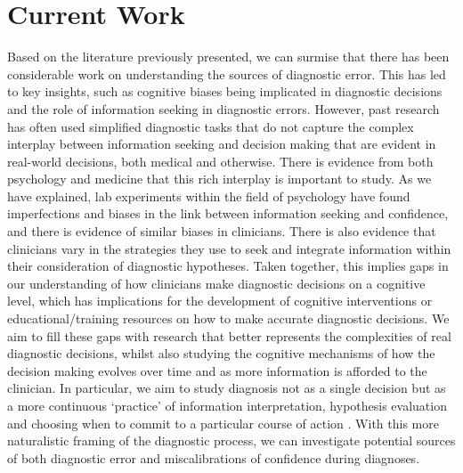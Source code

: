 \documentclass[a4paper, nobind]{templates/ociamthesis}
\begin{document}
\section{Current Work}\label{current-work}

Based on the literature previously presented, we can surmise that there has been considerable work on understanding the sources of diagnostic error. This has led to key insights, such as cognitive biases being implicated in diagnostic decisions and the role of information seeking in diagnostic errors. However, past research has often used simplified diagnostic tasks that do not capture the complex interplay between information seeking and decision making that are evident in real-world decisions, both medical and otherwise. There is evidence from both psychology and medicine that this rich interplay is important to study. As we have explained, lab experiments within the field of psychology have found imperfections and biases in the link between information seeking and confidence, and there is evidence of similar biases in clinicians. There is also evidence that clinicians vary in the strategies they use to seek and integrate information within their consideration of diagnostic hypotheses. Taken together, this implies gaps in our understanding of how clinicians make diagnostic decisions on a cognitive level, which has implications for the development of cognitive interventions or educational/training resources on how to make accurate diagnostic decisions. We aim to fill these gaps with research that better represents the complexities of real diagnostic decisions, whilst also studying the cognitive mechanisms of how the decision making evolves over time and as more information is afforded to the clinician. In particular, we aim to study diagnosis not as a single decision but as a more continuous `practice' of information interpretation, hypothesis evaluation and choosing when to commit to a particular course of action \autocite{alby_diagnostic_2015}. With this more naturalistic framing of the diagnostic process, we can investigate potential sources of both diagnostic error and miscalibrations of confidence during diagnoses.
\end{document}
